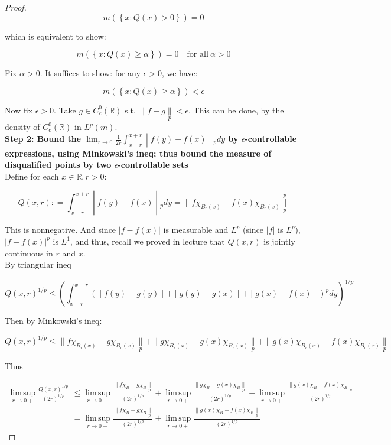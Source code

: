 \documentclass{qlnotes-export}
\begin{document}
\begin{proof}
\[m(\left\{ {x:Q(x) > 0} \right\}) = 0\]

which is equivalent to show:

\[m(\left\{ {x:Q(x) \geq \alpha} \right\}) = 0\quad\text{for all}\ \alpha > 0\]

Fix \(\alpha > 0\). It suffices to show: for any \(\epsilon > 0\), we have:

\[m(\left\{ {x:Q(x) \geq \alpha} \right\}) < \epsilon\]

Now fix \(\epsilon > 0\). Take \(g \in C_{c}^{0}({\mathbb{R}})\) s.t. \(\parallel f - g\underset{p}{\parallel} < \epsilon\). This can be done, by the density of \(C_{c}^{0}({\mathbb{R}})\) in \(L^{p}(m)\).\\
\textbf{Step 2: Bound the \(\left. \lim_{r\rightarrow 0}\frac{1}{2r}\int_{x - r}^{x + r} \middle| f(y) - f(x) \middle| {}_{p} dy \right.\) by \(\epsilon\)-controllable expressions, using Minkowski's ineq; thus bound the measure of disqualified points by two \(\epsilon\)-controllable sets}\\
Define for each \(x \in {\mathbb{R}},r > 0\):

\[\left. Q(x,r): = \int_{x - r}^{x + r} \middle| f(y) - f(x) \middle| {}_{p} dy = \parallel f\chi_{B_{r}(x)} - f(x)\chi_{B_{r}(x)}\underset{p}{\overset{p}{\parallel}} \right.\]

This is nonnegative. And since \(|f - f(x)|\) is measurable and \(L^{p}\) (since \(|f|\) is \(L^{p}\)), \(|f - f(x)|^{p}\) is \(L^{1}\), and thus, recall we proved in lecture that \(Q(x,r)\) is jointly continuous in \(r\) and \(x\).\\
By triangular ineq

\[\left. Q(x,r)^{1/p} \leq (\int_{x - r}^{x + r}( \middle| f(y) - g(y) \middle| + \middle| g(y) - g(x) \middle| + \middle| g(x) - f(x) \middle| )^{p} dy)^{1/p} \right.\]

Then by Minkowski's ineq:

\[Q(x,r)^{1/p} \leq \parallel f\chi_{B_{r}(x)} - g\chi_{B_{r}(x)}\underset{p}{\parallel} + \parallel g\chi_{B_{r}(x)} - g(x)\chi_{B_{r}(x)}\underset{p}{\parallel} + \parallel g(x)\chi_{B_{r}(x)} - f(x)\chi_{B_{r}(x)}\underset{p}{\parallel}\]

Thus

\[\begin{matrix}
{\operatorname{lim\, sup}\limits_{r\rightarrow 0 +}\frac{Q(x,r)^{1/p}}{(2r)^{1/p}}} & {\leq \operatorname{lim\, sup}\limits_{r\rightarrow 0 +}\frac{\parallel f\chi_{B} - g\chi_{B}\underset{p}{\parallel}}{(2r)^{1/p}} + \operatorname{lim\, sup}\limits_{r\rightarrow 0 +}\frac{\parallel g\chi_{B} - g(x)\chi_{B}\underset{p}{\parallel}}{(2r)^{1/p}} + \operatorname{lim\, sup}\limits_{r\rightarrow 0 +}\frac{\parallel g(x)\chi_{B} - f(x)\chi_{B}\underset{p}{\parallel}}{(2r)^{1/p}}} \\
 & {= \operatorname{lim\, sup}\limits_{r\rightarrow 0 +}\frac{\parallel f\chi_{B} - g\chi_{B}\underset{p}{\parallel}}{(2r)^{1/p}} + \operatorname{lim\, sup}\limits_{r\rightarrow 0 +}\frac{\parallel g(x)\chi_{B} - f(x)\chi_{B}\underset{p}{\parallel}}{(2r)^{1/p}}}
\end{matrix}\]


\end{proof}
\end{document}
